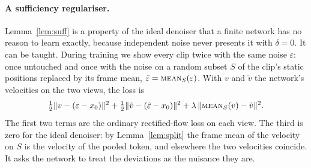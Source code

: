 \paragraph{A sufficiency regulariser.}
Lemma~\ref{lem:suff} is a property of the ideal denoiser that a finite network has no reason to learn exactly, because independent noise never presents it with $\delta=0$.
It can be taught.
During training we show every clip twice with the same noise $\varepsilon$: once untouched and once with the noise on a random subset $S$ of the clip's static positions replaced by its frame mean, $\tilde\varepsilon=\textup{\textsc{mean}}{}_S(\varepsilon)$.
With $v$ and $\tilde v$ the network's velocities on the two views, the loss is
\begin{equation}
\tfrac12\|v-(\varepsilon-x_0)\|^2+\tfrac12\|\tilde v-(\tilde\varepsilon-x_0)\|^2+\lambda\,\|\textup{\textsc{mean}}{}_S(v)-\tilde v\|^2 .
\label{eq:reg}
\end{equation}
The first two terms are the ordinary rectified-flow loss on each view.
The third is zero for the ideal denoiser: by Lemma~\ref{lem:split} the frame mean of the velocity on $S$ is the velocity of the pooled token, and elsewhere the two velocities coincide.
It asks the network to treat the deviations as the nuisance they are.
